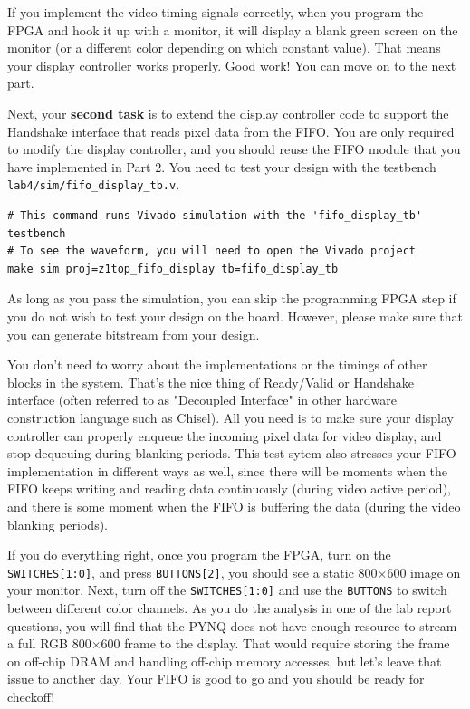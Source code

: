 \documentclass[11pt]{article}
\begin{document}
If you implement the video timing signals correctly, when you program the FPGA and hook it up with a monitor, it will display a blank green screen on the monitor (or a different color depending on which constant value). That means your display controller works properly. Good work! You can move on to the next part.

Next, your \textbf{second task} is to extend the display controller code to support the Handshake interface that reads pixel data from the FIFO. You are only required to modify the display controller, and you should reuse the FIFO module that you have implemented in Part 2. You need to test your design with the testbench \verb|lab4/sim/fifo_display_tb.v|.

\begin{verbatim}
# This command runs Vivado simulation with the 'fifo_display_tb' testbench
# To see the waveform, you will need to open the Vivado project
make sim proj=z1top_fifo_display tb=fifo_display_tb
\end{verbatim}

As long as you pass the simulation, you can skip the programming FPGA step if you do not wish to test your design on the board. However, please make sure that you can generate bitstream from your design.

You don't need to worry about the implementations or the timings of other blocks in the system. That's the nice thing of Ready/Valid or Handshake interface (often referred to as "Decoupled Interface" in other hardware construction language such as Chisel). All you need is to make sure your display controller can properly enqueue the incoming pixel data for video display, and stop dequeuing during blanking periods. This test sytem also stresses your FIFO implementation in different ways as well, since there will be moments when the FIFO keeps writing and reading data continuously (during video active period), and there is some moment when the FIFO is buffering the data (during the video blanking periods).

If you do everything right, once you program the FPGA, turn on the \verb|SWITCHES[1:0]|, and press \verb|BUTTONS[2]|, you should see a static 800$\times$600 image on your monitor. Next, turn off the \verb|SWITCHES[1:0]| and use the \verb|BUTTONS| to switch between different color channels. As you do the analysis in one of the lab report questions, you will find that the PYNQ does not have enough resource to stream a full RGB 800$\times$600 frame to the display. That would require storing the frame on off-chip DRAM and handling off-chip memory accesses, but let's leave that issue to another day. Your FIFO is good to go and you should be ready for checkoff!
\end{document}
